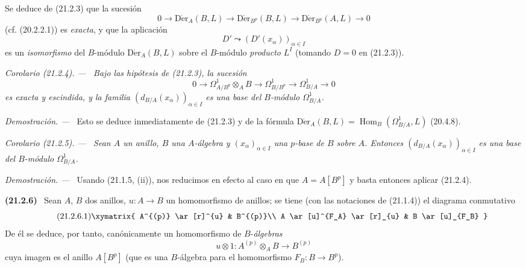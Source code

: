 \documentclass[10pt,oneside]{book}
\makeatletter
\newcommand{\setmanualcurrentlabel}[1]{\def\@currentlabel{#1}}
\newcommand{\oldpage}[2][]{%
  \setcounter{footnote}{0}%
  \marginpar{\scriptsize\textbf{#1}~|~#2}\ignorespaces}
\newenvironment{env}[1][]{\setmanualcurrentlabel{#1}\par\medskip\noindent\textbf{(#1)}\ }{\par}
\newenvironment{corollary}[1][]{%
  \setmanualcurrentlabel{#1}\par\medskip\noindent\itshape Corolario (#1). ---\ }{\par}
\newenvironment{proof}{%
  \par\medskip\noindent\textit{Demostración. ---\ }}{\par}
\makeatother
\begin{document}
Se deduce de (21.2.3) que la sucesión
\begin{equation}
\tag{21.2.3.1}
\label{0.21.2.3.1-es}
0\to\operatorname{D\acute{e}r}_A(B,L)\to\operatorname{D\acute{e}r}_{B^p}(B,L)
\to\operatorname{D\acute{e}r}_{B^p}(A,L)\to0
\end{equation}
(cf. (20.2.2.1)) es \emph{exacta}, y que la aplicación
\begin{equation}
\tag{21.2.3.2}
\label{0.21.2.3.2-es}
D'\leadsto(D'(x_\alpha))_{\alpha\in I}
\end{equation}
es un \emph{isomorfismo} del $B$-módulo $\operatorname{D\acute{e}r}_A(B,L)$ sobre el
$B$-módulo \emph{producto} $L^I$ (tomando $D=0$ en (21.2.3)).

\begin{corollary}[21.2.4]
\label{0.21.2.4-es}
Bajo las hipótesis de \textup{(21.2.3)}, la sucesión
\begin{equation}
\tag{21.2.4.1}
\label{0.21.2.4.1-es}
0\to\Omega^1_{A/B^p}\otimes_A B\to\Omega^1_{B/B^p}
\to\Omega^1_{B/A}\to0
\end{equation}
es exacta y escindida, y la familia $(d_{B/A}(x_\alpha))_{\alpha\in I}$ es
una base del $B$-módulo $\Omega^1_{B/A}$.
\end{corollary}

\begin{proof}
Esto se deduce inmediatamente de (21.2.3) y de la fórmula
$\operatorname{D\acute{e}r}_A(B,L)=\operatorname{Hom}_B(\Omega^1_{B/A},L)$ (20.4.8).
\end{proof}

\begin{corollary}[21.2.5]
\label{0.21.2.5-es}
Sean $A$ un anillo, $B$ una $A$-álgebra y $(x_\alpha)_{\alpha\in I}$ una
$p$-base de $B$ sobre $A$. Entonces $(d_{B/A}(x_\alpha))_{\alpha\in I}$ es
una base del $B$-módulo $\Omega^1_{B/A}$.
\end{corollary}

\begin{proof}
Usando (21.1.5, (ii)), nos reducimos en efecto al caso en que $A=A[B^p]$ y basta
entonces aplicar (21.2.4).
\end{proof}

\oldpage[0\textsubscript{IV-1}]{159}
\begin{env}[21.2.6]
\label{0.21.2.6-es}
Sean $A$, $B$ dos anillos, $u:A\to B$ un homomorfismo de anillos; se tiene
(con las notaciones de (21.1.4)) el diagrama conmutativo
\begin{equation}
\tag{21.2.6.1}
\label{0.21.2.6.1-es}
\xymatrix{
 A^{(p)} \ar[r]^{u} & B^{(p)}\\
 A \ar[u]^{F_A} \ar[r]_{u} & B \ar[u]_{F_B}
}
\end{equation}
De él se deduce, por tanto, canónicamente un homomorfismo de $B$-\emph{álgebras}
\begin{equation}
\tag{21.2.6.2}
\label{0.21.2.6.2-es}
u\otimes1:A^{(p)}\otimes_A B\longrightarrow B^{(p)}
\end{equation}
cuya imagen es el anillo $A[B^p]$ (que es una $B$-álgebra para el
homomorfismo $F_B:B\to B^p$).
\end{env}
\end{document}
